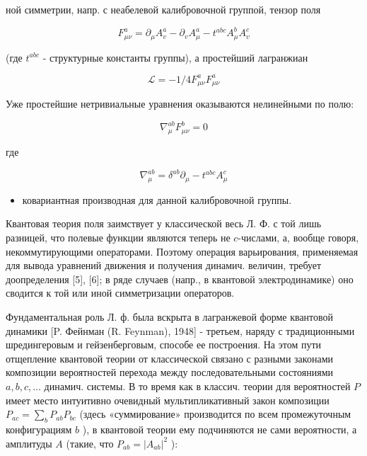 \documentclass[10pt]{article}
\begin{document}
ной симметрии, напр. с неабелевой калибровочной группой, тензор поля



\[

F_{\mu \nu}^{a}=\partial_{\mu} A_{v}^{a}-\partial_{v} A_{\mu}^{a}-t^{a b c} A_{\mu}^{b} A_{v}^{c}

\]



(где $t^{a b c}$ - структурные константы группы), а простейший лагранжиан



\[

\mathscr{L}=-1 / 4 F_{\mu \nu}^{a} F_{\mu \nu}^{a}

\]



Уже простейшие нетривиальные уравнения оказываются нелинейными по полю:



\[

\nabla_{\mu}^{a b} F_{\mu \nu}^{b}=0

\]



где



\[

\nabla_{\mu}^{a b}=\delta^{a b} \partial_{\mu}-t^{a b c} A_{\mu}^{c}

\]



\begin{itemize}

  \item ковариантная производная для данной калибровочной группы.

\end{itemize}



Квантовая теория поля заимствует у классической весь Л. Ф. с той лишь разницей, что полевые функции являются теперь не $c$-числами, а, вообще говоря, некоммутирующими операторами. Поэтому операция варьирования, применяемая для вывода уравнений движения и получения динамич. величин, требует доопределения [5], [6]; в ряде случаев (напр., в квантовой электродинамике) оно сводится к той или иной симметризации операторов.



Фундаментальная роль Л. ф. была вскрыта в лагранжевой форме квантовой динамики [P. Фейнман (R. Feynman), 1948] - третьем, наряду с традиционными шредингеровым и гейзенберговым, способе ее построения. На этом пути отщепление квантовой теории от классической связано с разными законами композиции вероятностей перехода между последовательными состояниями $a, b, c, \ldots$ динамич. системы. В то время как в классич. теории для вероятностей $P$ имеет место интуитивно очевидный мультипликативный закон композиции $P_{a c}=\sum_{b} P_{a b} P_{b c}$ (здесь «суммирование» производится по всем промежуточным конфигурациям $b$ ), в квантовой теории ему подчиняются не сами вероятности, а амплитуды $A$ (такие, что $P_{a b}=\left|A_{a b}\right|^{2}$ ):
\end{document}
